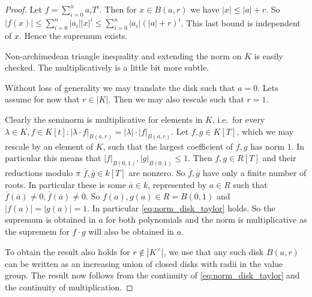 \begin{proof}
	Let $f = \sum_{i = 0}^{n} a_i T^{i}$. 
	Then for $x \in B(a, r)$ we have $|x| \le |a| + r$. 
	So  $|f(x)| \le  \sum_{i = 0}^{n} |a_i| |x|^{i} \le \sum_{i = 0}^{n}|a_i| (|a| + r)^{i} $. 
	This last bound is independent of $x$. Hence the supremum exists. 

	Non-archimedean triangle inequality and extending the norm on $K$ is easily checked. 
	The multiplicatively is a little bit more subtle. 

	Without loss of generality we may translate the disk such that $a = 0$. 
	Lets assume for now that $r \in |K|$.
	Then we may also rescale such that $r = 1$. 

	Clearly the seminorm is multiplicative for elements in  $K$, i.e.\ for every $\lambda \in K, f \in K[t]: |\lambda \cdot f|_{B(a, r)} = |\lambda|\cdot |f|_{B(a, r)}$.  Let $f, g \in K[T]$, which we may rescale by an element of $K$, such that the largest coefficient of $f, g$ has norm $1$. In particular this means that $|f|_{B(0,1)}, |g|_{B(0,1)} \le 1$. 
	Then $f, g \in R[T]$ and their  reductions modulo  $\pi$ $\overline{f}, \overline{g} \in k[T]$ are nonzero.
	So $\overline{f}, \overline{g}$ have only a finite number of roots. In particular these is some $\overline{a} \in k$, represented by $a \in R$ such that $\overline{f}(\overline{a}) \ne 0, \overline{f}(\overline{a})\ne 0$. 
	So $f(a), g(a) \in R = B(0, 1)$ and $|f(a)| = |g(a)| = 1$. 
	In particular \cref{eq:norm_disk_taylor} holds. 
	So the supremum is obtained in $a$ for both polynomials and the norm is multiplicative as the supremem for $f\cdot g$ will also be obtained in $a$. 


	To obtain the result also holds for $r \not\in |K^{\times }|$, we use that any such disk $B(a, r)$ can be written as an increasing union of closed disks with radii in the value group. The result now follows from the continuity of \cref{eq:norm_disk_taylor} and the continuity of multiplication. 
\end{proof}



